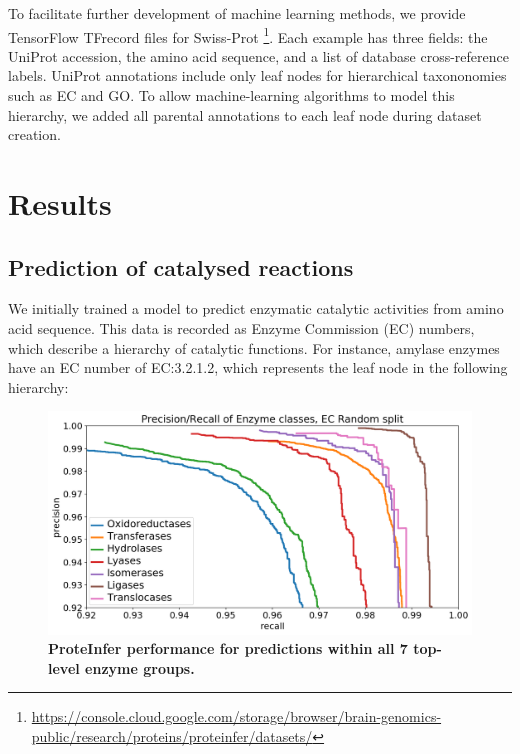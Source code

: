 To facilitate further development of machine learning methods, we provide TensorFlow \citep{abadi2016tensorflow} TFrecord files for Swiss-Prot \footnote{\url{https://console.cloud.google.com/storage/browser/brain-genomics-public/research/proteins/proteinfer/datasets/}}. Each example has three fields: the UniProt accession, the amino acid sequence, and a list of database cross-reference labels. UniProt annotations include only leaf nodes for hierarchical taxononomies such as EC and GO. To allow machine-learning algorithms to model this hierarchy, we added all parental annotations to each leaf node during dataset creation. 
\section*{Results}
\subsection*{Prediction of catalysed reactions}
We initially trained a model to predict enzymatic catalytic activities from amino acid sequence. This data is recorded as Enzyme Commission (EC) numbers, which describe a hierarchy of catalytic functions. For instance, \textbeta{} amylase enzymes have an EC number of EC:3.2.1.2, which represents the leaf node in the following hierarchy:
\renewcommand\DTstyle{\rmfamily}
\setlength{\DTbaselineskip}{15pt}
\medskip
{}
\medskip
\begin{figure}
\centering
  \includegraphics[width=\columnwidth]{Figures/ec_performance_by_top_level_class.png}%
  \caption{\textbf{ProteInfer performance for predictions within all 7 top-level enzyme groups.}}
  \label{fig:toplevel}
\end{figure}
